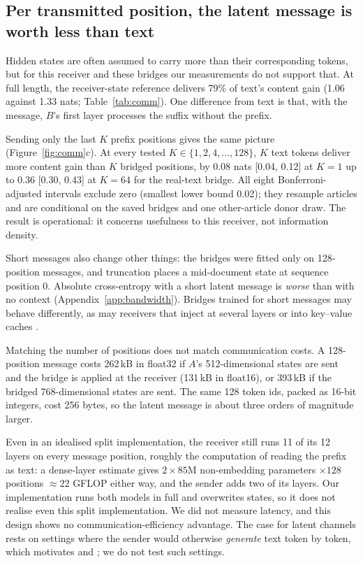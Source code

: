 \subsection{Per transmitted position, the latent message is worth less than text}
\label{sec:bandwidth}
Hidden states are often assumed to carry more than their corresponding tokens, but for this receiver and these bridges our measurements do not support that. At full length, the receiver-state reference delivers 79\% of text's content gain (1.06 against 1.33 nats; Table~\ref{tab:comm}). One difference from text is that, with the message, $B$'s first layer processes the suffix without the prefix.

Sending only the last $K$ prefix positions gives the same picture (Figure~\ref{fig:comm}c). At every tested $K\in\{1,2,4,\dots,128\}$, $K$ text tokens deliver more content gain than $K$ bridged positions, by 0.08 nats [0.04, 0.12] at $K=1$ up to 0.36 [0.30, 0.43] at $K=64$ for the real-text bridge. All eight Bonferroni-adjusted intervals exclude zero (smallest lower bound 0.02); they resample articles and are conditional on the saved bridges and one other-article donor draw. The result is operational: it concerns usefulness to this receiver, not information density.

Short messages also change other things: the bridges were fitted only on 128-position messages, and truncation places a mid-document state at sequence position 0. Absolute cross-entropy with a short latent message is \emph{worse} than with no context (Appendix~\ref{app:bandwidth}). Bridges trained for short messages may behave differently, as may receivers that inject at several layers or into key--value caches \citep{fu2026c2c}.

Matching the number of positions does not match communication costs. A 128-position message costs 262\,kB in float32 if $A$'s 512-dimensional states are sent and the bridge is applied at the receiver (131\,kB in float16), or 393\,kB if the bridged 768-dimensional states are sent. The same 128 token ids, packed as 16-bit integers, cost 256 bytes, so the latent message is about three orders of magnitude larger.

Even in an idealised split implementation, the receiver still runs 11 of its 12 layers on every message position, roughly the computation of reading the prefix as text: a dense-layer estimate gives $2\times85$M non-embedding parameters $\times128$ positions $\approx 22$ GFLOP either way, and the sender adds two of its layers. Our implementation runs both models in full and overwrites states, so it does not realise even this split implementation. We did not measure latency, and this design shows no communication-efficiency advantage. The case for latent channels rests on settings where the sender would otherwise \emph{generate} text token by token, which motivates \citet{fu2026c2c} and \citet{zou2025latentmas}; we do not test such settings.
